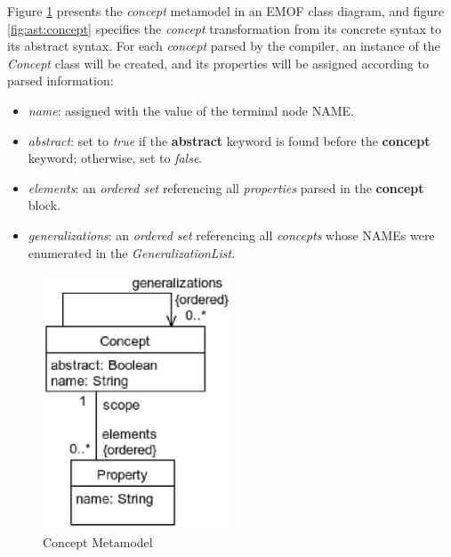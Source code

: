\begin{abstract-syntax}
Figure \ref{fig:meta:concept} presents the \emph{concept} metamodel
in an EMOF \cite{mof} class diagram,
and figure \ref{fig:ast:concept} specifies
the \emph{concept} transformation
from its concrete syntax to its abstract syntax.
For each \emph{concept} parsed by the compiler,
an instance of the \emph{Concept} class will be created,
and its properties will be assigned
according to parsed information:

\begin{itemize}

\item \emph{name}:
assigned with the value of the terminal node NAME.

\item \emph{abstract}:
set to \emph{true} if the \textbf{abstract} keyword
is found before the \textbf{concept} keyword;
otherwise, set to \emph{false}.

\item \emph{elements}:
an \emph{ordered set} referencing all \emph{properties}
parsed in the \textbf{concept} block.

\item \emph{generalizations}:
an \emph{ordered set} referencing all \emph{concepts}
whose NAMEs were enumerated in the \emph{GeneralizationList}.

\end{itemize}
\end{abstract-syntax}

\begin{figure}
\centering
\includegraphics[width=0.5\textwidth]{metamodel/concept}
\caption{Concept Metamodel}
\label{fig:meta:concept}
\end{figure}

